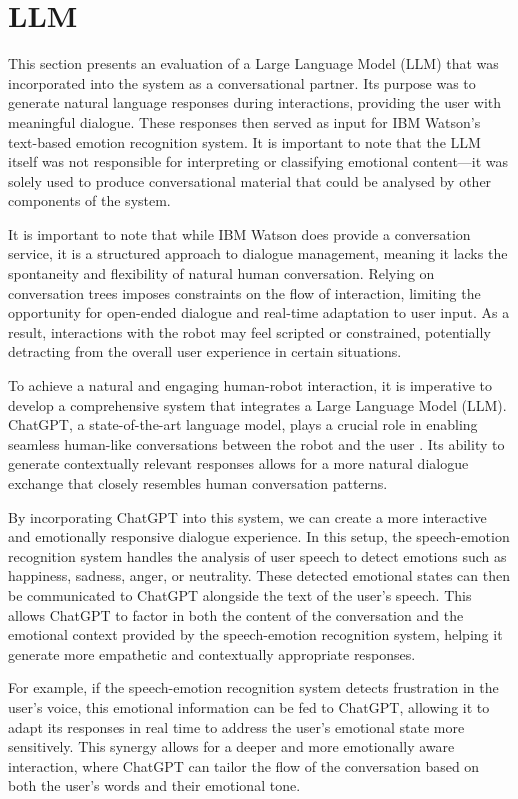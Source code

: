\section{LLM}

This section presents an evaluation of a Large Language Model (LLM) that was incorporated into the system as a conversational partner. Its purpose was to generate natural language responses during interactions, providing the user with meaningful dialogue. These responses then served as input for IBM Watson's text-based emotion recognition system. It is important to note that the LLM itself was not responsible for interpreting or classifying emotional content—it was solely used to produce conversational material that could be analysed by other components of the system.

It is important to note that while IBM Watson does provide a conversation service, it is a structured approach to dialogue management, meaning it lacks the spontaneity and flexibility of natural human conversation. Relying on conversation trees imposes constraints on the flow of interaction, limiting the opportunity for open-ended dialogue and real-time adaptation to user input. As a result, interactions with the robot may feel scripted or constrained, potentially detracting from the overall user experience in certain situations.

To achieve a natural and engaging human-robot interaction, it is imperative to develop a comprehensive system that integrates a Large Language Model (LLM). ChatGPT, a state-of-the-art language model, plays a crucial role in enabling seamless human-like conversations between the robot and the user \cite{chatgpt}. Its ability to generate contextually relevant responses allows for a more natural dialogue exchange that closely resembles human conversation patterns.

By incorporating ChatGPT into this system, we can create a more interactive and emotionally responsive dialogue experience. In this setup, the speech-emotion recognition system handles the analysis of user speech to detect emotions such as happiness, sadness, anger, or neutrality. These detected emotional states can then be communicated to ChatGPT alongside the text of the user's speech. This allows ChatGPT to factor in both the content of the conversation and the emotional context provided by the speech-emotion recognition system, helping it generate more empathetic and contextually appropriate responses.

For example, if the speech-emotion recognition system detects frustration in the user's voice, this emotional information can be fed to ChatGPT, allowing it to adapt its responses in real time to address the user's emotional state more sensitively. This synergy allows for a deeper and more emotionally aware interaction, where ChatGPT can tailor the flow of the conversation based on both the user's words and their emotional tone.

